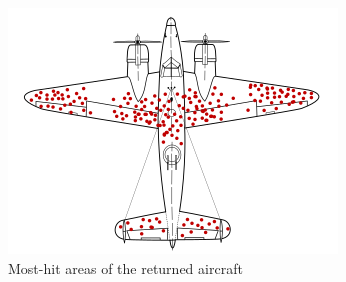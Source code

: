 
\begin{figure}
  \centering
  \includegraphics[width=\textwidth]{images/Survivorship-bias.png}
  \caption{Most-hit areas of the returned aircraft}
  \label{fig:survival-bias}
\end{figure}

